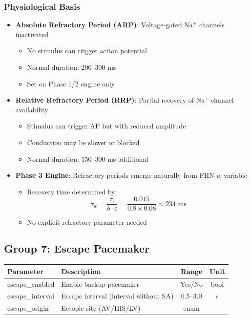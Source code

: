 \documentclass[11pt, a4paper]{article}
\begin{document}
\subsubsection{Physiological Basis}
\begin{itemize}
    \item \textbf{Absolute Refractory Period (ARP)}: Voltage-gated Na$^+$ channels inactivated
        \begin{itemize}
            \item No stimulus can trigger action potential
            \item Normal duration: 200--300 ms
            \item Set on Phase 1/2 engine only
        \end{itemize}
    \item \textbf{Relative Refractory Period (RRP)}: Partial recovery of Na$^+$ channel availability
        \begin{itemize}
            \item Stimulus can trigger AP but with reduced amplitude
            \item Conduction may be slower or blocked
            \item Normal duration: 150--300 ms additional
        \end{itemize}
    \item \textbf{Phase 3 Engine}: Refractory periods emerge naturally from FHN $w$ variable
        \begin{itemize}
            \item Recovery time determined by:
            \begin{equation}
                \tau_w = \frac{\tau_s}{b \cdot \varepsilon} = \frac{0.015}{0.8 \times 0.08} \approx 234 \text{ ms}
            \end{equation}
            \item No explicit refractory parameter needed
        \end{itemize}
\end{itemize}

\subsection{Group 7: Escape Pacemaker}

\begin{tabularx}{\textwidth}{|l|X|c|c|}
\hline
\textbf{Parameter} & \textbf{Description} & \textbf{Range} & \textbf{Unit} \\
\hline
escape\_enabled & Enable backup pacemaker & Yes/No & bool \\
escape\_interval & Escape interval (interval without SA) & 0.5--3.0 & s \\
escape\_origin & Ectopic site (AV/HIS/LV) & enum & - \\
\hline
\end{tabularx}
\end{document}
